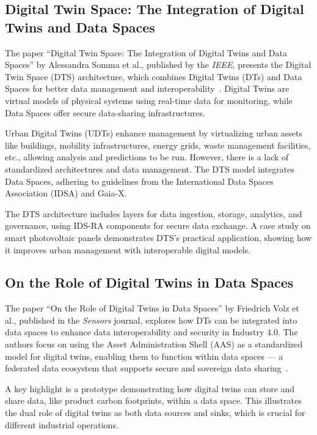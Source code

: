 \subsection[Digital Twin Space]{Digital Twin Space: The Integration of Digital Twins and Data Spaces}\label{subsec:digital-twin-space:-the-integration-of-digital-twins-and-data-spaces}

The paper ``Digital Twin Space: The Integration of Digital Twins and Data Spaces'' by Alessandra Somma et al., published by the \textit{IEEE}, presents the Digital Twin Space (DTS) architecture, which combines Digital Twins (DTs) and Data Spaces for better data management and interoperability~\cite{digital_twins_and_data_spaces}.
Digital Twins are virtual models of physical systems using real-time data for monitoring, while Data Spaces offer secure data-sharing infrastructures.

Urban Digital Twins (UDTs) enhance management by virtualizing urban assets like buildings, mobility infrastructures, energy grids, waste management facilities, etc., allowing analysis and predictions to be run.
However, there is a lack of standardized architectures and data management.
The DTS model integrates Data Spaces, adhering to guidelines from the International Data Spaces Association (IDSA) and Gaia-X.

The DTS architecture includes layers for data ingestion, storage, analytics, and governance, using IDS-RA components for secure data exchange.
A case study on smart photovoltaic panels demonstrates DTS's practical application, showing how it improves urban management with interoperable digital models.

\subsection{On the Role of Digital Twins in Data Spaces}\label{subsec:on-the-role-of-digital-twins-in-data-spaces}

The paper ``On the Role of Digital Twins in Data Spaces'' by Friedrich Volz et al., published in the \textit{Sensors} journal, explores how DTs can be integrated into data spaces to enhance data interoperability and security in Industry 4.0. The authors focus on using the Asset Administration Shell (AAS) as a standardized model for digital twins, enabling them to function within data spaces --- a federated data ecosystem that supports secure and sovereign data sharing~\cite{role_of_digital_twins_in_data_spaces}.

A key highlight is a prototype demonstrating how digital twins can store and share data, like product carbon footprints, within a data space.
This illustrates the dual role of digital twins as both data sources and sinks, which is crucial for different industrial operations.

